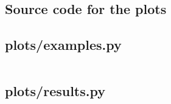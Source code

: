 \documentclass[a4paper, doc, draftall]{apa6}
\begin{document}
	


\printbibliography
\newpage

\begin{appendices}
	\section{Source code for the plots}
		\subsection{plots/examples.py}
		\label{code:examples}
		\inputminted[mathescape, linenos, numbersep=5pt, frame=lines, framesep=2mm]{python}{scripts/examples.py}
		\newpage
		
		\subsection{plots/results.py}
		\label{code:results}
		\inputminted[mathescape, linenos, numbersep=5pt, frame=lines, framesep=2mm]{python}{scripts/results.py}
\end{appendices}
\end{document}
